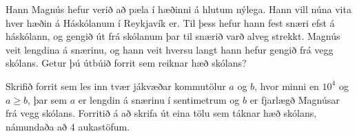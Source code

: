 
Hann Magnús hefur verið að pæla í hæðinni á hlutum nýlega. Hann vill núna vita
hver hæðin á Háskólanum í Reykjavík er. Til þess hefur hann fest snæri efst á
háskólann, og gengið út frá skólanum þar til snærið varð alveg strekkt. Magnús
veit lengdina á snærinu, og hann veit hversu langt hann hefur gengið frá vegg
skólans. Getur þú útbúið forrit sem reiknar hæð skólans?

Skrifið forrit sem les inn tvær jákvæðar kommutölur $a$ og $b$, hvor minni en
$10^4$ og $a\geq b$, þar sem $a$ er lengdin á snærinu í sentimetrum og $b$ er
fjarlægð Magnúsar frá vegg skólans. Forritið á að skrifa út eina tölu sem
táknar hæð skólans, námundaða að $4$ aukastöfum.

